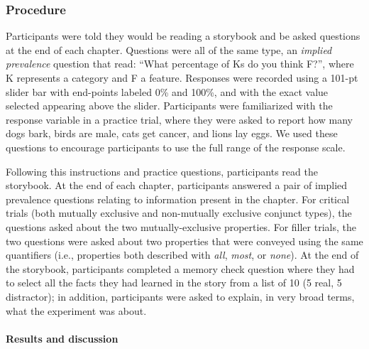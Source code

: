 \documentclass[10pt,letterpaper]{article}
\newcommand{\red}[1]{{\textcolor{Red}{#1}}}
\begin{document}
\subsubsection{Procedure}
Participants were told they would be reading a storybook and be asked questions at the end of each chapter. 
Questions were all of the same type, an \emph{implied prevalence} question \cite{Gelman2002, Cimpian2010} that read: ``What percentage of Ks do you think F?'', where K represents a category and F a feature. 
Responses were recorded using a 101-pt slider bar with end-points labeled 0\% and 100\%, and with the exact value selected appearing above the slider. 
Participants were familiarized with the response variable in a practice trial, where they were asked to report how many dogs bark, birds are male, cats get cancer, and lions lay eggs. 
We used these questions to encourage participants to use the full range of the response scale. 



Following this instructions and practice questions, participants read the storybook.
At the end of each chapter, participants answered a pair of implied prevalence questions relating to information present in the chapter. 
For critical trials (both mutually exclusive and non-mutually exclusive conjunct types), the questions asked about the two mutually-exclusive properties.
For filler trials, the two questions were asked about two properties that were conveyed using the same quantifiers (i.e., properties both described with \emph{all}, \emph{most}, or \emph{none}).
At the end of the storybook, participants completed a memory check question where they had to select all the facts they had learned in the story from a list of 10 (5 real, 5 distractor); in addition, participants were asked to explain, in very broad terms, what the experiment was about.



\paragraph{Results and discussion}
\end{document}
